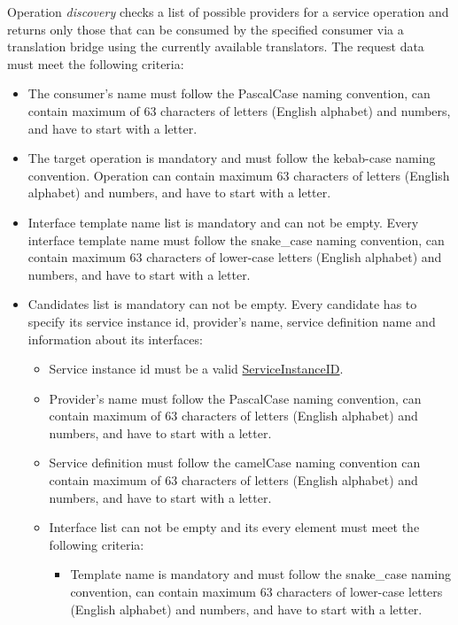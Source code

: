 \documentclass[a4paper]{arrowhead}
\newcommand{\pref}[1]{{\textcolor{ArrowheadGrey}{\hyperref[sec:model:primitives:#1]{#1}}}}
\begin{document}
{}

Operation \textit{discovery} checks a list of possible providers for a service operation and returns only those that can be consumed by the specified consumer via a translation bridge using the currently available translators. The request data must meet the following criteria:

\begin{itemize}
    \item The consumer's name must follow the PascalCase naming convention, can contain maximum of 63 characters of letters (English alphabet) and numbers, and have to start with a letter.
    \item The target operation is mandatory and must follow the kebab-case naming convention.  Operation can contain maximum 63 characters of letters (English alphabet) and numbers, and have to start with a letter.
    \item Interface template name list is mandatory and can not be empty. Every interface template name must follow the snake\_case naming convention, can contain maximum 63 characters of lower-case letters (English alphabet) and numbers, and have to start with a letter.
    \item Candidates list is mandatory can not be empty. Every candidate has to specify its service instance id, provider's name, service definition name and information about its interfaces:
    \begin{itemize}
        \item Service instance id must be a valid \pref{ServiceInstanceID}.
        \item Provider's name must follow the PascalCase naming convention, can contain maximum of 63 characters of letters (English alphabet) and numbers, and have to start with a letter.
        \item Service definition must follow the camelCase naming convention can contain maximum of 63 characters of letters (English alphabet) and numbers, and have to start with a letter.
        \item Interface list can not be empty and its every element must meet the following criteria:
        \begin{itemize}
            \item Template name is mandatory and must follow the snake\_case naming convention, can contain maximum 63 characters of lower-case letters (English alphabet) and numbers, and have to start with a letter.

\end{itemize}
\end{itemize}
\end{itemize}
\end{document}
